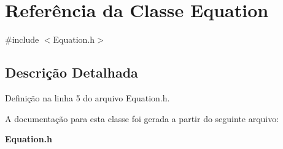 \section{Referência da Classe Equation}
\label{class_equation}


{\ttfamily \#include $<$Equation.\+h$>$}



\subsection{Descrição Detalhada}


Definição na linha 5 do arquivo Equation.\+h.



A documentação para esta classe foi gerada a partir do seguinte arquivo\+:\begin{DoxyCompactItemize}
\item 
{\bf Equation.\+h}\end{DoxyCompactItemize}
